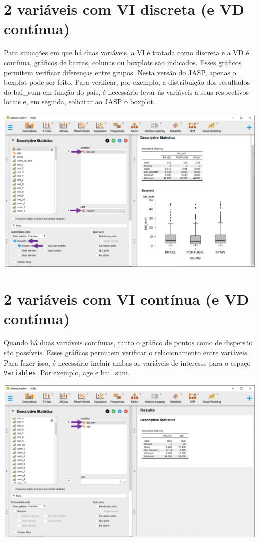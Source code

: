 \documentclass[
]{book}
\begin{document}
\hypertarget{variuxe1veis-com-vi-discreta-e-vd-contuxednua-1}{%
\section{2 variáveis com VI discreta (e VD
contínua)}\label{variuxe1veis-com-vi-discreta-e-vd-contuxednua-1}}

Para situações em que há duas variáveis, a VI é tratada como discreta e
a VD é contínua, gráficos de barras, colunas ou boxplots são indicados.
Esses gráficos permitem verificar diferenças entre grupos. Nesta versão
do JASP, apenas o boxplot pode ser feito. Para verificar, por exemplo, a
distribuição dos resultados do bai\_sum em função do país, é necessário
levar às variáveis a seus respectivos locais e, em seguida, solicitar ao
JASP o boxplot.

\includegraphics{./img/cap_desc_jasp_grafico_boxplot_grupo.png}

\hypertarget{variuxe1veis-com-vi-contuxednua-e-vd-contuxednua-1}{%
\section{2 variáveis com VI contínua (e VD
contínua)}\label{variuxe1veis-com-vi-contuxednua-e-vd-contuxednua-1}}

Quando há duas variáveis contínuas, tanto o gráfico de pontos como de
dispersão são possíveis. Esses gráficos permitem verificar o
relacionamento entre variáveis. Para fazer isso, é necessário incluir
ambas as variáveis de interesse para o espaço \texttt{Variables}. Por
exemplo, age e bai\_sum.

\includegraphics{./img/cap_desc_jasp_grafico_scatter1.png}
\end{document}
